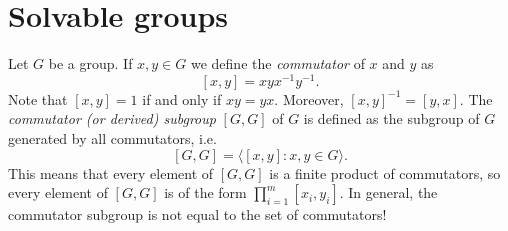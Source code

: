 
\section{Solvable groups}

Let $G$ be a group. If $x,y\in G$ we define
the \emph{commutator} of $x$ and $y$ as
\[
[x,y]=xyx^{-1}y^{-1}.
\]
Note that $[x,y]=1$ if and only if $xy=yx$. 
Moreover, $[x,y]^{-1}=[y,x]$. 
The
\emph{commutator (or derived) subgroup} $[G,G]$ of $G$ is defined as
the subgroup of $G$ generated by all commutators, i.e. 
\[
[G,G]=\langle [x,y]:x,y\in G\rangle.
\]
This means that every element of $[G,G]$ is a finite product of commutators, 
so every element of $[G,G]$ is of the form $\prod_{i=1}^m [x_i,y_i]$. 
In general, the commutator subgroup is not equal to the set of commutators!

